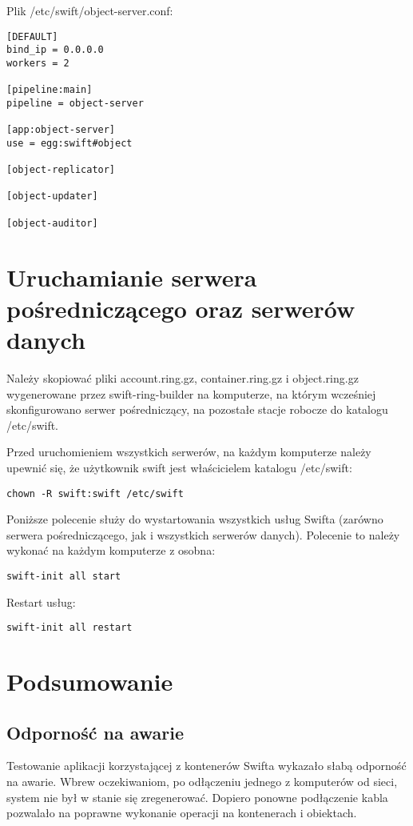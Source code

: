 \documentclass[12pt]{article}
\begin{document}
Plik /etc/swift/object-server.conf: 

\begin{verbatim}
[DEFAULT]
bind_ip = 0.0.0.0
workers = 2

[pipeline:main]
pipeline = object-server

[app:object-server]
use = egg:swift#object

[object-replicator]

[object-updater]

[object-auditor]
\end{verbatim}

\section{Uruchamianie serwera pośredniczącego oraz serwerów danych}

Należy skopiować pliki account.ring.gz, container.ring.gz i object.ring.gz wygenerowane przez swift-ring-builder na komputerze, na którym wcześniej skonfigurowano serwer pośredniczący, na pozostałe stacje robocze do katalogu /etc/swift.

Przed uruchomieniem wszystkich serwerów, na każdym komputerze należy upewnić się, że użytkownik swift jest właścicielem katalogu /etc/swift:

\begin{verbatim}
chown -R swift:swift /etc/swift
\end{verbatim}

Poniższe polecenie służy do wystartowania wszystkich usług Swifta (zarówno serwera pośredniczącego, jak i wszystkich serwerów danych). Polecenie to należy wykonać na każdym komputerze z osobna:

\begin{verbatim}
swift-init all start
\end{verbatim}
	
Restart usług:
	
\begin{verbatim}
swift-init all restart
\end{verbatim}

\section{Podsumowanie}
\subsection{Odporność na awarie}

Testowanie aplikacji korzystającej z kontenerów Swifta wykazało słabą odporność na awarie. Wbrew oczekiwaniom, po odłączeniu jednego z komputerów od sieci, system nie był w stanie się zregenerować. Dopiero ponowne podłączenie kabla pozwalało na poprawne wykonanie operacji na kontenerach i obiektach.
\end{document}
